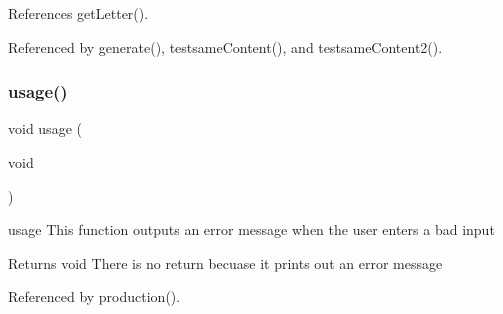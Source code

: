 References get\+Letter().



Referenced by generate(), testsame\+Content(), and testsame\+Content2().

\mbox{\label{production_8h_ae8605e2b78cd4a81b6c6b5c30cb7366a}} 
\subsubsection{usage()}
{\footnotesize\ttfamily void usage (\begin{DoxyParamCaption}\item[{void}]{ }\end{DoxyParamCaption})}

usage This function outputs an error message when the user enters a bad input \begin{DoxyReturn}{Returns}
void There is no return becuase it prints out an error message 
\end{DoxyReturn}


Referenced by production().


